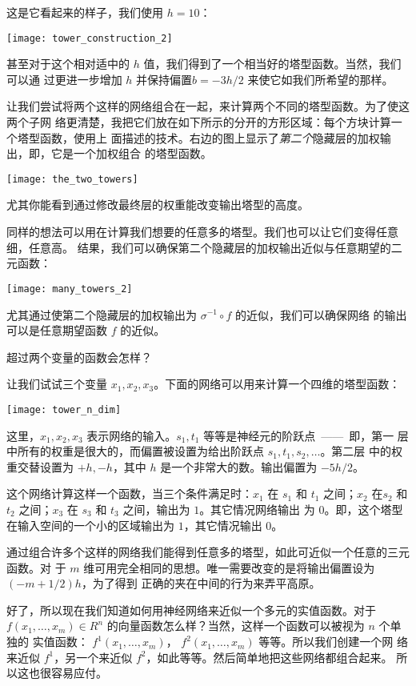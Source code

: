 这是它看起来的样子，我们使用 $h = 10$：
\begin{center}
  \texttt{[image: tower\_construction\_2]}
\end{center}

甚至对于这个相对适中的 $h$ 值，我们得到了一个相当好的塔型函数。当然，我们可以通
过更进一步增加 $h$ 并保持偏置$b = -3h/2$ 来使它如我们所希望的那样。

让我们尝试将两个这样的网络组合在一起，来计算两个不同的塔型函数。为了使这两个子网
络更清楚，我把它们放在如下所示的分开的方形区域：每个方块计算一个塔型函数，使用上
面描述的技术。右边的图上显示了\emph{第二个}隐藏层的加权输出，即，它是一个加权组合
的塔型函数。
\begin{center}
  \texttt{[image: the\_two\_towers]}
\end{center}

尤其你能看到通过修改最终层的权重能改变输出塔型的高度。

同样的想法可以用在计算我们想要的任意多的塔型。我们也可以让它们变得任意细，任意高。
结果，我们可以确保第二个隐藏层的加权输出近似与任意期望的二元函数：
\begin{center}
  \texttt{[image: many\_towers\_2]}
\end{center}

尤其通过使第二个隐藏层的加权输出为 $\sigma^{-1} \circ f$ 的近似，我们可以确保网络
的输出可以是任意期望函数 $f$ 的近似。

超过两个变量的函数会怎样？

让我们试试三个变量 $x_1, x_2, x_3$。下面的网络可以用来计算一个四维的塔型函数：
\begin{center}
  \texttt{[image: tower\_n\_dim]}
\end{center}

这里，$x_1, x_2, x_3$ 表示网络的输入。$s_1, t_1$ 等等是神经元的阶跃点~——~即，第一
层中所有的权重是很大的，而偏置被设置为给出阶跃点 $s_1, t_1, s_2, \ldots$。第二层
中的权重交替设置为 $+h, -h$，其中 $h$ 是一个非常大的数。输出偏置为 $-5h/2$。

这个网络计算这样一个函数，当三个条件满足时：$x_1$ 在 $s_1$ 和 $t_1$ 之间；$x_2$
在$s_2$ 和 $t_2$ 之间；$x_3$ 在 $s_3$ 和 $t_3$ 之间，输出为 $1$。其它情况网络输出
为 $0$。即，这个塔型在输入空间的一个小的区域输出为 $1$，其它情况输出 $0$。

通过组合许多个这样的网络我们能得到任意多的塔型，如此可近似一个任意的三元函数。对
于 $m$ 维可用完全相同的思想。唯一需要改变的是将输出偏置设为 $(-m+1/2)h$，为了得到
正确的夹在中间的行为来弄平高原。%

好了，所以现在我们知道如何用神经网络来近似一个多元的实值函数。对于 $f(x_1,
\ldots, x_m) \in R^n$ 的向量函数怎么样？当然，这样一个函数可以被视为 $n$ 个单独的
实值函数： $f^1(x_1, \ldots, x_m)$， $f^2(x_1, \ldots, x_m)$ 等等。所以我们创建一个网
络来近似 $f^1$，另一个来近似 $f^2$，如此等等。然后简单地把这些网络都组合起来。 所
以这也很容易应付。

